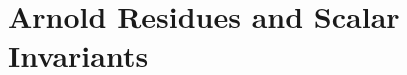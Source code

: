 %
%

\providecommand{\fg}{\mathfrak{g}}
\providecommand{\fh}{\mathfrak{h}}
\providecommand{\hv}{h^{\vee}}
\providecommand{\Conf}{C}
\providecommand{\Confnord}{\Conf_n^{\mathrm{ord}}}
\providecommand{\BarOrd}{B^{\mathrm{ord}}}
\providecommand{\BarSym}{B^{\Sigma}}
\providecommand{\Tcoalg}{T^{c}}
\providecommand{\Sym}{\mathrm{Sym}}
\providecommand{\Op}{\mathrm{Op}}
\providecommand{\End}{\mathrm{End}}
\providecommand{\Hom}{\mathrm{Hom}}
\providecommand{\Res}{\operatorname{Res}}
\providecommand{\Ran}{\mathrm{Ran}}
\providecommand{\BRST}{\mathrm{BRST}}
\providecommand{\cghost}{c_{\mathrm{ghost}}}
\providecommand{\bc}{\mathrm{bc}}
\providecommand{\Sug}{\mathrm{Sug}}
\providecommand{\KZ}{\mathrm{KZ}}
\providecommand{\KZB}{\mathrm{KZB}}
\providecommand{\Arn}{\mathrm{Arnold}}
\providecommand{\ConnConf}{\mathsf{ConnConf}}
\providecommand{\ChirAlg}{\mathsf{ChirAlg}}
\providecommand{\BRSTGaugedChirAlg}{\mathsf{BRSTGaugedChirAlg}}
\providecommand{\Cone}{\operatorname{cone}}
\providecommand{\dlog}{d\log}
\providecommand{\Phihol}{\Phi_{\mathrm{hol}}}
\providecommand{\PhiCY}{\Phi}
\providecommand{\SpCh}{\mathrm{Sp}^{\mathrm{ch}}}
\providecommand{\PhiFA}{\Phi^{\mathrm{FA}}}
\providecommand{\dbar}{d_{\mathrm{bar}}}
\providecommand{\Hch}{H^{\bullet}_{\mathrm{ch}}}
\providecommand{\IdC}{\mathrm{Id}_{\mathrm{ConnConf}}}

\chapter{Arnold Residues and Scalar Invariants}
\label{chap:climax-platonic}\label{ch:chiral-climax-platonic}

